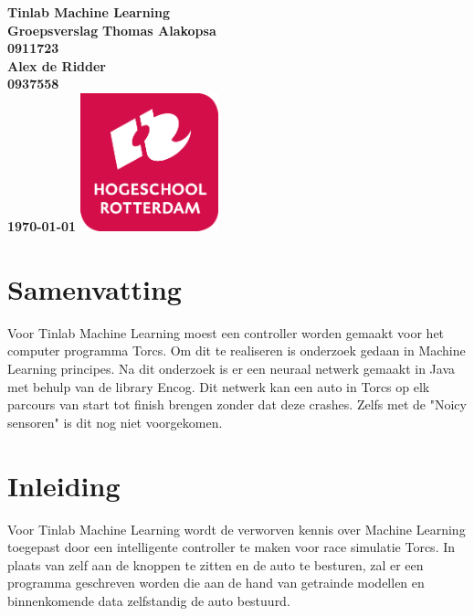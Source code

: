 \documentclass{article}
\begin{document}
\sffamily
\begin{titlepage}
  \centering
    \vfill
    {\bfseries\Huge
      Tinlab Machine Learning \\
      Groepsverslag
        \vskip2cm
      }
      {\bfseries\Large
      	Thomas Alakopsa\\
      	{ \bfseries\normalsize
      	0911723\\
      	}
      }
      {\bfseries\Large
      	Alex de Ridder\\
      	{ \bfseries\normalsize
      	0937558\\
      	}
      }
      {
        \bfseries\normalsize
        \vskip2cm
        \today
    }    
    \vfill
    \includegraphics[width=4cm]{logohr.png}
    \vfill
    \vfill
\end{titlepage}
\newpage

\section{Samenvatting}
Voor Tinlab Machine Learning moest een controller worden gemaakt voor het computer programma Torcs. Om dit te realiseren is onderzoek gedaan in Machine Learning principes. Na dit onderzoek is er een neuraal netwerk gemaakt in Java met behulp van de library Encog. Dit netwerk kan een auto in Torcs op elk parcours van start tot finish brengen zonder dat deze crashes. Zelfs met de "Noicy sensoren" is dit nog niet voorgekomen. 
\pagebreak
\section{Inleiding}
Voor Tinlab Machine Learning wordt de verworven kennis over Machine Learning toegepast door een intelligente controller te maken voor race simulatie Torcs. In plaats van zelf aan de knoppen te zitten en de auto te besturen, zal er een programma geschreven worden die aan de hand van getrainde modellen en binnenkomende data zelfstandig de auto bestuurd. 
\end{document}
